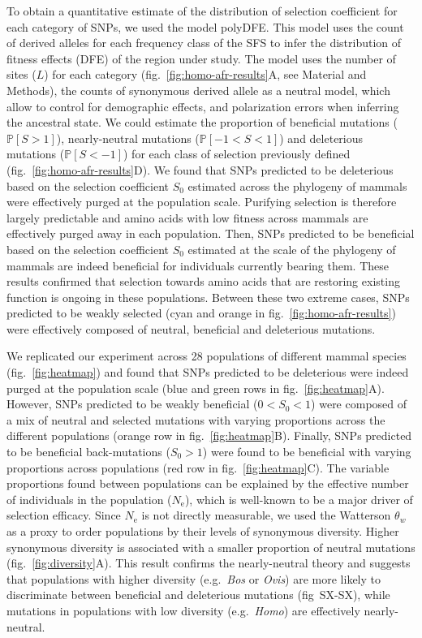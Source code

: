 \documentclass{article}
\newcommand{\Ne}{N_{\textrm{e}}}
\newcommand{\proba}{\mathbb{P}}
\newcommand{\Sphy}{S_{0}}
\newcommand{\divWeakAdv}{0 < \Sphy < 1}
\newcommand{\divAdv}{ \Sphy > 1}
\newcommand{\Spop}{S}
\newcommand{\polyDel}{\Spop < -1}
\newcommand{\polyNeutral}{-1 < \Spop < 1}
\newcommand{\polyAdv}{ \Spop > 1}
\newcommand{\PpolyDel}{\proba \left[ \polyDel \right]}
\newcommand{\PpolyNeutral}{\proba \left[ \polyNeutral \right]}
\newcommand{\PpolyAdv}{\proba \left[ \polyAdv \right]}
\begin{document}
    To obtain a quantitative estimate of the distribution of selection coefficient for each category of SNPs, we used the model polyDFE\cite{tataru_inference_2017, tataru_polydfe_2020}.
    This model uses the count of derived alleles for each frequency class of the SFS to infer the distribution of fitness effects (DFE) of the region under study.
    The model uses the number of sites ($L$) for each category (fig.~\ref{fig:homo-afr-results}A, see Material and Methods), the counts of synonymous derived allele as a neutral model, which allow to control for demographic effects, and polarization errors when inferring the ancestral state.
    We could estimate the proportion of beneficial mutations ($\PpolyAdv$), nearly-neutral mutations ($\PpolyNeutral$) and deleterious mutations ($\PpolyDel$) for each class of selection previously defined (fig.~\ref{fig:homo-afr-results}D).
    We found that SNPs predicted to be deleterious based on the selection coefficient $\Sphy$ estimated across the phylogeny of mammals were effectively purged at the population scale.
    Purifying selection is therefore largely predictable and amino acids with low fitness across mammals are effectively purged away in each population.
    Then, SNPs predicted to be beneficial based on the selection coefficient $\Sphy$ estimated at the scale of the phylogeny of mammals are indeed beneficial for individuals currently bearing them.
    These results confirmed that selection towards amino acids that are restoring existing function is ongoing in these populations.
    Between these two extreme cases, SNPs predicted to be weakly selected (cyan and orange in fig.~\ref{fig:homo-afr-results}) were effectively composed of neutral, beneficial and deleterious mutations.

    We replicated our experiment across 28 populations of different mammal species (fig.~\ref{fig:heatmap}) and found that SNPs predicted to be deleterious were indeed purged at the population scale (blue and green rows in fig.~\ref{fig:heatmap}A).
    However, SNPs predicted to be weakly beneficial ($\divWeakAdv$) were composed of a mix of neutral and selected mutations with varying proportions across the different populations (orange row in fig.~\ref{fig:heatmap}B).
    Finally, SNPs predicted to be beneficial back-mutations ($\divAdv$) were found to be beneficial with varying proportions across populations (red row in fig.~\ref{fig:heatmap}C).
    The variable proportions found between populations can be explained by the effective number of individuals in the population ($\Ne$), which is well-known to be a major driver of selection efficacy.
    Since $\Ne$ is not directly measurable, we used the Watterson $\theta_w$ as a proxy to order populations by their levels of synonymous diversity.
    Higher synonymous diversity is associated with a smaller proportion of neutral mutations (fig.~\ref{fig:diversity}A).
    This result confirms the nearly-neutral theory and suggests that populations with higher diversity (e.g.~\textit{Bos} or \textit{Ovis}) are more likely to discriminate between beneficial and deleterious mutations (fig~SX-SX), while mutations in populations with low diversity (e.g.~\textit{Homo}) are effectively nearly-neutral.
\end{document}
